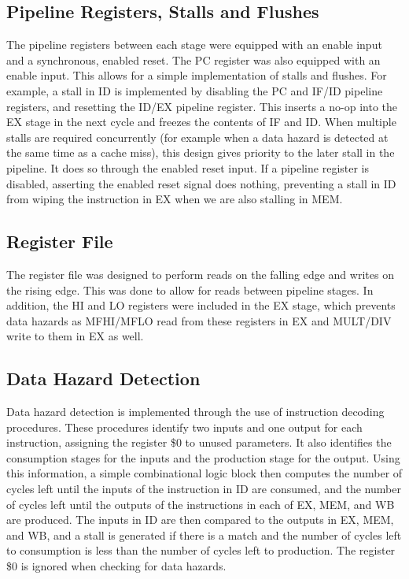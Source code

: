 \documentclass[conference, hidelinks]{IEEEtran}
\begin{document}
\subsection{Pipeline Registers, Stalls and Flushes}

The pipeline registers between each stage were equipped with an enable input and a synchronous, enabled reset. The PC register was also equipped with an enable input. This allows for a simple implementation of stalls and flushes. For example, a stall in ID is implemented by disabling the PC and IF/ID pipeline registers, and resetting the ID/EX pipeline register. This inserts a no-op into the EX stage in the next cycle and freezes the contents of IF and ID. When multiple stalls are required concurrently (for example when a data hazard is detected at the same time as a cache miss), this design gives priority to the later stall in the pipeline. It does so through the enabled reset input. If a pipeline register is disabled, asserting the enabled reset signal does nothing, preventing a stall in ID from wiping the instruction in EX when we are also stalling in MEM.

\subsection{Register File}

The register file was designed to perform reads on the falling edge and writes on the rising edge. This was done to allow for reads between pipeline stages. In addition, the HI and LO registers were included in the EX stage, which prevents data hazards as MFHI/MFLO read from these registers in EX and MULT/DIV write to them in EX as well.

\subsection{Data Hazard Detection}

Data hazard detection is implemented through the use of instruction decoding procedures. These procedures identify two inputs and one output for each instruction, assigning the register \$0 to unused parameters. It also identifies the consumption stages for the inputs and the production stage for the output. Using this information, a simple combinational logic block then computes the number of cycles left until the inputs of the instruction in ID are consumed, and the number of cycles left until the outputs of the instructions in each of EX, MEM, and WB are produced. The inputs in ID are then compared to the outputs in EX, MEM, and WB, and a stall is generated if there is a match and the number of cycles left to consumption is less than the number of cycles left to production. The register \$0 is ignored when checking for data hazards.
\end{document}
